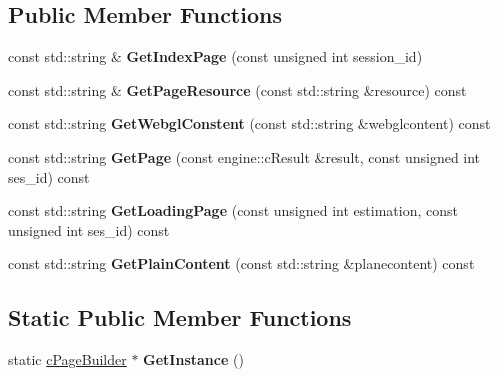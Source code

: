 \subsection*{\-Public \-Member \-Functions}
\begin{DoxyCompactItemize}
\item 
\hypertarget{classhttp__server_1_1cPageBuilder_aad87a17faa8505727c8faac59a7a9674}{
const std\-::string \& {\bfseries \-Get\-Index\-Page} (const unsigned int session\-\_\-id)}
\label{classhttp__server_1_1cPageBuilder_aad87a17faa8505727c8faac59a7a9674}

\item 
\hypertarget{classhttp__server_1_1cPageBuilder_ac7a52ef639767e3f9297376cced2a8ab}{
const std\-::string \& {\bfseries \-Get\-Page\-Resource} (const std\-::string \&resource) const }
\label{classhttp__server_1_1cPageBuilder_ac7a52ef639767e3f9297376cced2a8ab}

\item 
\hypertarget{classhttp__server_1_1cPageBuilder_a4fe126d4cae409f0e9790cbcf187185f}{
const std\-::string {\bfseries \-Get\-Webgl\-Constent} (const std\-::string \&webglcontent) const }
\label{classhttp__server_1_1cPageBuilder_a4fe126d4cae409f0e9790cbcf187185f}

\item 
\hypertarget{classhttp__server_1_1cPageBuilder_a399e3fcab5b631e64907a183af1e8b44}{
const std\-::string {\bfseries \-Get\-Page} (const engine\-::c\-Result \&result, const unsigned int ses\-\_\-id) const }
\label{classhttp__server_1_1cPageBuilder_a399e3fcab5b631e64907a183af1e8b44}

\item 
\hypertarget{classhttp__server_1_1cPageBuilder_a903fe3604f402c70bd04aefbbe322cbc}{
const std\-::string {\bfseries \-Get\-Loading\-Page} (const unsigned int estimation, const unsigned int ses\-\_\-id) const }
\label{classhttp__server_1_1cPageBuilder_a903fe3604f402c70bd04aefbbe322cbc}

\item 
\hypertarget{classhttp__server_1_1cPageBuilder_a1d94480e16491f15aa3ed974dfb181e1}{
const std\-::string {\bfseries \-Get\-Plain\-Content} (const std\-::string \&planecontent) const }
\label{classhttp__server_1_1cPageBuilder_a1d94480e16491f15aa3ed974dfb181e1}

\end{DoxyCompactItemize}
\subsection*{\-Static \-Public \-Member \-Functions}
\begin{DoxyCompactItemize}
\item 
\hypertarget{classhttp__server_1_1cPageBuilder_acf7940105f1b4f5d77a0cecac9a69db6}{
static \hyperlink{classhttp__server_1_1cPageBuilder}{c\-Page\-Builder} $\ast$ {\bfseries \-Get\-Instance} ()}
\label{classhttp__server_1_1cPageBuilder_acf7940105f1b4f5d77a0cecac9a69db6}

\end{DoxyCompactItemize}
